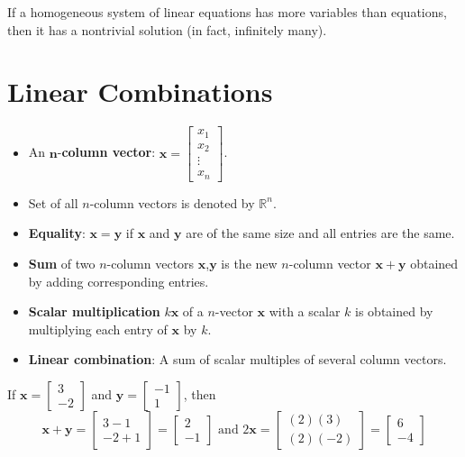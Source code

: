 \documentclass[20pt,a4paper]{extarticle}
\newcounter{example}[section]
\newcounter{theorem}
\newcounter{definition}[section]
\begin{document}
\begin{theorem}
If a homogeneous system of linear equations has more variables than equations, then it has a nontrivial solution (in fact, infinitely many).
\end{theorem}

\newpage 

\section{Linear Combinations}

\vspace*{-0.5cm}

\begin{definition}
\begin{itemize}
	\item An $\mathbf{n}$-\textbf{column vector}: $\mathbf{x} = \begin{bmatrix} x_1 \\ x_2 \\ \vdots \\ x_n \end{bmatrix}$. 
	\item Set of all $n$-column vectors is denoted by $\mathbb{R}^n$.
	\item \textbf{Equality}: $\mathbf{x} = \mathbf{y}$ if $\mathbf{x}$ and $\mathbf{y}$ are of the same size and all entries are the same.
	\item \textbf{Sum} of two $n$-column vectors $\mathbf{x}$,$\mathbf{y}$ is the new $n$-column vector $\mathbf{x} + \mathbf{y}$ obtained by adding corresponding entries.
	\item \textbf{Scalar multiplication} $k\mathbf{x}$ of a $n$-vector $\mathbf{x}$ with a scalar $k$ is obtained by multiplying each entry of $\mathbf{x}$ by $k$.
	\item \textbf{Linear combination}: A sum of scalar multiples of several column vectors.
\end{itemize}
\end{definition}

\begin{example}
If $\mathbf{x} = \begin{bmatrix} 3 \\ -2 \end{bmatrix}$ and $\mathbf{y} = \begin{bmatrix} -1 \\ 1 \end{bmatrix}$, then
	\[
		\mathbf{x} + \mathbf{y} = \begin{bmatrix} 3 - 1 \\ -2 + 1 \end{bmatrix} = \begin{bmatrix} 2 \\ -1 \end{bmatrix} \text{ and } 2 \mathbf{x} = \begin{bmatrix} (2) (3) \\ (2)(-2) \end{bmatrix} = \begin{bmatrix} 6 \\ -4 \end{bmatrix}
	\]
\end{example}
\end{document}
